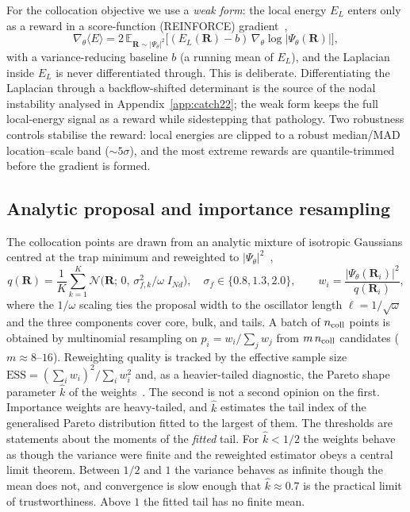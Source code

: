 For the collocation objective we use a \emph{weak form}: the local energy $E_L$ enters
only as a reward in a score-function (REINFORCE) gradient~\cite{Williams1992-REINFORCE},
\begin{equation}
  \nabla_\theta \langle E\rangle
  = 2\,\mathbb{E}_{\mathbf R\sim|\Psi_\theta|^2}\!\big[(E_L(\mathbf R)-b)\,
    \nabla_\theta \log|\Psi_\theta(\mathbf R)|\big],
  \label{eq:reinforce-method}
\end{equation}
with a variance-reducing baseline $b$ (a running mean of $E_L$), and the Laplacian inside
$E_L$ is never differentiated through. This is deliberate. Differentiating the Laplacian
through a backflow-shifted determinant is the source of the nodal instability analysed in
Appendix~\ref{app:catch22}; the weak form keeps the full local-energy signal as a reward
while sidestepping that pathology. Two robustness controls stabilise the reward: local
energies are clipped to a robust median/MAD location--scale band ($\sim\!5\sigma$), and the
most extreme rewards are quantile-trimmed before the gradient is formed.

\subsection{Analytic proposal and importance resampling}
\label{subsec:colloc-proposal}
The collocation points are drawn from an analytic mixture of isotropic Gaussians centred at
the trap minimum and reweighted to $|\Psi_\theta|^2$~\cite{KalosLevesqueVerlet1974-ImportanceSampling},
\begin{equation}
  q(\mathbf R)=\frac{1}{K}\sum_{k=1}^{K}\mathcal N\!\big(\mathbf R;\,0,\,\sigma_{f,k}^2/\omega\;I_{Nd}\big),
  \quad \sigma_f\in\{0.8,1.3,2.0\},
  \qquad
  w_i=\frac{|\Psi_\theta(\mathbf R_i)|^2}{q(\mathbf R_i)},
  \label{eq:colloc-proposal}
\end{equation}
where the $1/\omega$ scaling ties the proposal width to the oscillator length
$\ell=1/\sqrt\omega$ and the three components cover core, bulk, and tails. A batch of
$n_{\rm coll}$ points is obtained by multinomial resampling on $p_i=w_i/\sum_j w_j$ from
$m\,n_{\rm coll}$ candidates ($m\!\approx\!8$--$16$). Reweighting quality is tracked by the
effective sample size $\mathrm{ESS}=(\sum_i w_i)^2/\sum_i w_i^2$ and, as a heavier-tailed
diagnostic, the Pareto shape parameter $\hat k$ of the
weights~\cite{Vehtari2024}. The second is not a second opinion on the first. Importance
weights are heavy-tailed, and $\hat k$ estimates the tail index of the generalised Pareto
distribution fitted to the largest of them. The thresholds are statements about the
moments of the \emph{fitted} tail. For $\hat k<1/2$ the weights behave as though the
variance were finite and the reweighted estimator obeys a central limit theorem. Between
$1/2$ and $1$ the variance behaves as infinite though the mean does not, and convergence is
slow enough that $\hat k\approx0.7$ is the practical limit of trustworthiness. Above $1$ the
fitted tail has no finite mean.

